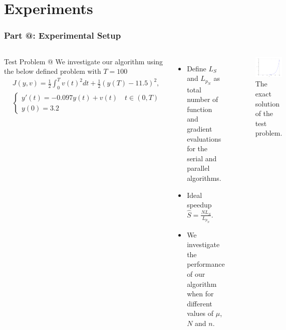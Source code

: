 \documentclass[9pt]{beamer}
\makeatletter
\newcommand*{\rom}[1]{\expandafter\@slowromancap\romannumeral #1@}
\makeatother
\begin{document}
\section{Experiments}
\begin{frame}
\frametitle{\textbf{ Part \rom{5}:} Experimental Setup}
\begin{columns}
\begin{block}{Test Problem \rom{2}}
We investigate our algorithm using the below defined problem with $T=100$
{\small\begin{align*}
&J(y,v) = \frac{1}{2}\int_0^{T}v(t)^2dt + \frac{1}{2}(y(T)-11.5)^2, \\
&\left\{
     \begin{array}{lr}
       	y'(t)=-0.097y(t) + v(t) \quad t\in(0,T)\\
       	y(0)=3.2
     \end{array}
   \right. 
\end{align*}}
\end{block}
\begin{itemize}
\item<1->{Define $L_S$ and $L_{p_N}$ as total number of function and gradient evaluations for the serial and parallel algorithms.}
\item<1->{Ideal speedup $\hat{S}=\frac{N L_S}{L_{p_N}}$.}
\item<1->{We investigate the performance of our algorithm when for different values of $\mu$, $N$ and $n$.}
\end{itemize}
\begin{figure}
\includegraphics[scale=0.25]{exact.png}
\caption{The exact solution of the test problem.}
\end{figure}
\end{columns}
\end{frame}
\end{document}

